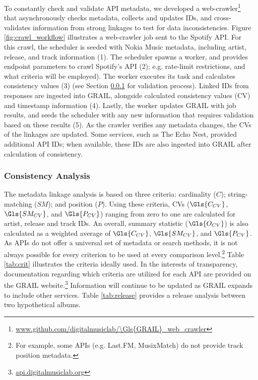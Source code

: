 \documentclass[a4paper]{article}
\begin{document}
To constantly check and validate \Gls{API} metadata, we developed a web-crawler\footnote{\url{www.github.com/digitalmusiclab/\Gls{GRAIL}_web_crawler}} that asynchronously checks metadata, collects and updates IDs, and cross-validates information from strong linkages to test for data inconsistencies. Figure \ref{fig:crawl_workflow} illustrates a web-crawler job sent to the Spotify \Gls{API}. For this crawl, the scheduler is seeded with Nokia Music metadata, including artist, release, and track information (1). The scheduler spawns a worker, and provides endpoint parameters to crawl Spotify's \Gls{API} (2); e.g. rate-limit restrictions, and what criteria will be employed). The worker executes its task and calculates consistency values (3) (see Section \ref{sec:crit} for validation process). Linked IDs from responses are ingested into \Gls{GRAIL}, alongside calculated consistency values (\Gls{CV}) and timestamp information (4). Lastly, the worker updates \Gls{GRAIL} with job results, and seeds the scheduler with any new information that requires validation based on these results (5). As the crawler verifies any metadata changes, the \Gls{CV}s of the linkages are updated. Some services, such as The Echo Nest, provided additional \Gls{API} IDs; when available, these IDs are also ingested into \Gls{GRAIL} after calculation of consistency. 

\subsubsection{Consistency Analysis}\label{sec:crit}
The metadata linkage analysis is based on three criteria: cardinality ($C$); string-matching ($SM$); and position ($P$). Using these criteria, \Gls{CV}s ($\Gls{C_{CV}}$, $\Gls{SM_{CV}}$, and $\Gls{P_{CV}}$) ranging from zero to one are calculated for artist, release and track IDs. An overall, summary statistic ($\Gls{O_{CV}}$) is also calculated as a weighted average of $\Gls{C_{CV}}$, $\Gls{SM_{CV}}$, and $\Gls{P_{CV}}$. As \Gls{API}s do not offer a universal set of metadata or search methods, it is not always possible for every criterion to be used at every comparison level.\footnote{For example, some \Gls{API}s (e.g. Last.FM, MusixMatch) do not provide track position metadata.} Table \ref{tab:crit} illustrates the criteria ideally used. In the interests of transparency, documentation regarding which criteria are utilized for each \Gls{API} are provided on the \Gls{GRAIL} website.\footnote{\url{api.digitalmusiclab.org}} Information will continue to be updated as \Gls{GRAIL} expands to include other services. Table \ref{tab:release} provides a release analysis between two hypothetical albums.
\end{document}
